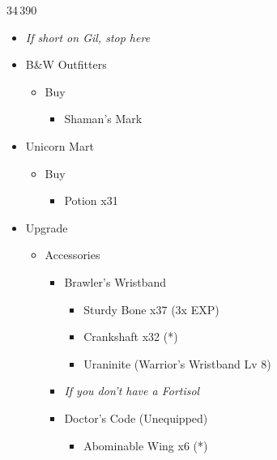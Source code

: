 \begin{paracol}{2}
\begin{shop}{34\,390}
\begin{itemize}
\begin{itemize}
\begin{itemize}
				            \end{itemize}
			      \end{itemize}
			\item \textit{If short on Gil, stop here}
			\item B\&W Outfitters
			      \begin{itemize}
				      \item Buy
				            \begin{itemize}
					            \item Shaman's Mark
				            \end{itemize}
			      \end{itemize}
			\item Unicorn Mart
			      \begin{itemize}
				      \item Buy
				            \begin{itemize}
					            \item Potion x31
				            \end{itemize}
			      \end{itemize}
		\end{itemize}
	\end{shop}
	\begin{upgrade}
		\begin{itemize}
			\item Upgrade
			      \begin{itemize}
				      \item Accessories
				            \begin{itemize}
					            \item Brawler's Wristband
					                  \begin{itemize}
						                  \item Sturdy Bone x37 (3x EXP)
						                  \item Crankshaft x32 (*)
						                  \item Uraninite (Warrior's Wristband Lv 8)
					                  \end{itemize}
					            \item \textit{If you don't have a Fortisol}
					            \item Doctor's Code (Unequipped)
					                  \begin{itemize}
						                  \item Abominable Wing x6 (*)
					                  \end{itemize}

\end{itemize}
\end{itemize}
\end{itemize}
\end{upgrade}
\end{paracol}
